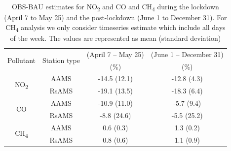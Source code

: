 \begin{table}[tbh!]
    \centering
    \caption[OBS-BAU estimates for NO\textsubscript{2} and CO and CH\textsubscript{4}]{OBS-BAU estimates for NO\textsubscript{2} and CO and CH\textsubscript{4} during the lockdown (April 7 to May 25) and the post-lockdown (June 1 to December 31). For CH\textsubscript{4} analysis we only consider timeseries estimate which include all days of the week. The values are represented as mean (standard deviation)}
    \begin{tabular}{c c c c}
    \hline
    \multirow{2}{*}{Pollutant} & \multirow{2}{*}{Station type} & (April 7 – May 25) & (June 1 – December 31) \\ 
                                &                              & (\%) & (\%) \\ \hline
    \multirow{2}{*}{NO\textsubscript{2}} & AAMS & -14.5 (12.1) & -12.8 (4.3)  \\
        & RsAMS & -19.1 (13.5) & -18.3 (6.4)  \\ \hline
    \multirow{2}{*}{CO} & AAMS & -10.9 (11.0) & -5.7 (9.4)  \\
        & RsAMS & -8.8 (24.6) & -5.5 (25.2)  \\ \hline
    \multirow{2}{*}{CH\textsubscript{4}} & AAMS & 0.6 (0.3) & 1.3 (0.2)  \\
        & RsAMS & 0.8 (0.6) & 1.1 (0.9)  \\ \hline
    \end{tabular}
    \label{tab:chap4_tab3}
\end{table}

